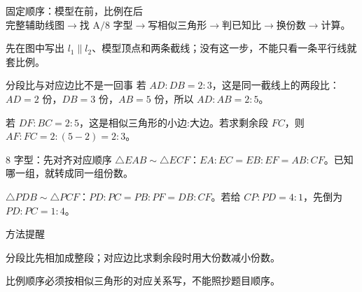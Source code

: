 \documentclass{exam-zh}
\begin{document}


\begin{eduSolutionBox}{固定顺序：模型在前，比例在后}
  \begingroup
  \setlength{\parskip}{2.5mm}
$\text{完整辅助线图}\to\text{找 A/8 字型}\to\text{写相似三角形}\to\text{判已知比}\to\text{换份数}\to\text{计算}$。\par
先在图中写出 $l_1\parallel l_2$、模型顶点和两条截线；没有这一步，不能只看一条平行线就套比例。\par
  \endgroup
\end{eduSolutionBox}





\begin{eduSolutionBox}{分段比与对应边比不是一回事}
  \begingroup
  \setlength{\parskip}{2.5mm}
若 $AD:DB=2:3$，这是同一截线上的两段比：$AD=2$ 份，$DB=3$ 份，$AB=5$ 份，所以 $AD:AB=2:5$。\par
若 $DF:BC=2:5$，这是相似三角形的小边:大边。若求剩余段 $FC$，则 $AF:FC=2:(5-2)=2:3$。\par
  \endgroup
\end{eduSolutionBox}





\begin{eduSolutionBox}{8 字型：先对齐对应顺序}
  \begingroup
  \setlength{\parskip}{2.5mm}
$\triangle EAB\sim\triangle ECF$：$EA:EC=EB:EF=AB:CF$。已知哪一组，就转成同一组份数。\par
$\triangle PDB\sim\triangle PCF$：$PD:PC=PB:PF=DB:CF$。若给 $CP:PD=4:1$，先倒为 $PD:PC=1:4$。\par
  \endgroup
\end{eduSolutionBox}




\begin{eduSummaryBlock}{\eduIconPin}{方法提醒}
\begin{eduBulletList}
  \item 分段比先相加成整段；对应边比求剩余段时用大份数减小份数。  \item 比例顺序必须按相似三角形的对应关系写，不能照抄题目顺序。\end{eduBulletList}
\end{eduSummaryBlock}
\end{document}

